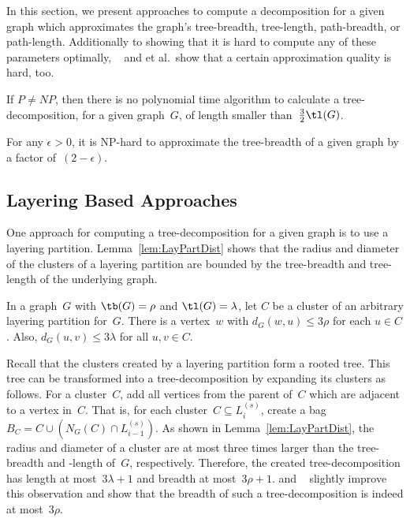 In this section, we present approaches to compute a decomposition for a given graph which approximates the graph's tree-breadth, tree-length, path-breadth, or path-length.
Additionally to showing that it is hard to compute any of these parameters optimally, ~\cite{Lokshtanov2010} and  et al.\,\cite{DucoLegaNiss2016} show that a certain approximation quality is hard, too.

\begin{theorem}
If \( \mathit{P} \neq \mathit{NP} \), then there is no polynomial time algorithm to calculate a tree-decomposition, for a given graph~\( G \), of length smaller than~\( \frac{3}{2} \tl(G) \).
\end{theorem}

\begin{theorem}
For any $\epsilon > 0$, it is NP-hard to approximate the tree-breadth of a given graph by a factor of~\( (2 - \epsilon) \).
\end{theorem}


\subsection{Layering Based Approaches}

One approach for computing a tree-decomposition for a given graph is to use a layering partition.
Lemma~\ref{lem:LayPartDist} shows that the radius and diameter of the clusters of a layering partition are bounded by the tree-breadth and tree-length of the underlying graph.

\begin{lemma}
    \label{lem:LayPartDist}
In a graph~\( G \) with \( \tb(G) = \rho \) and \( \tl(G) = \lambda \),
let \( C \) be a cluster of an arbitrary layering partition for~\( G \).
There is a vertex~\( w \) with \( d_G(w, u) \leq 3 \rho \) for each \( u \in C \).
Also, \( d_G(u, v) \leq 3 \lambda \) for all \( u, v \in C \).
\end{lemma}

Recall that the clusters created by a layering partition form a rooted tree.
This tree can be transformed into a tree-decomposition by expanding its clusters as follows.
For a cluster~$C$, add all vertices from the parent of~$C$ which are adjacent to a vertex in~$C$.
That is, for each cluster~$C \subseteq L_i^{(s)}$, create a bag~$B_C = C \cup \left(N_G(C) \cap L_{i-1}^{(s)}\right)$.
As shown in Lemma~\ref{lem:LayPartDist}, the radius and diameter of a cluster are at most three times larger than the tree-breadth and -length of~$G$, respectively.
Therefore, the created tree-decomposition has length at most~$3 \lambda + 1$ and breadth at most~$3 \rho + 1$.
 and ~\cite{AbuAtaDragan2016} slightly improve this observation and show that the breadth of such a tree-decomposition is indeed at most~$3 \rho$.

